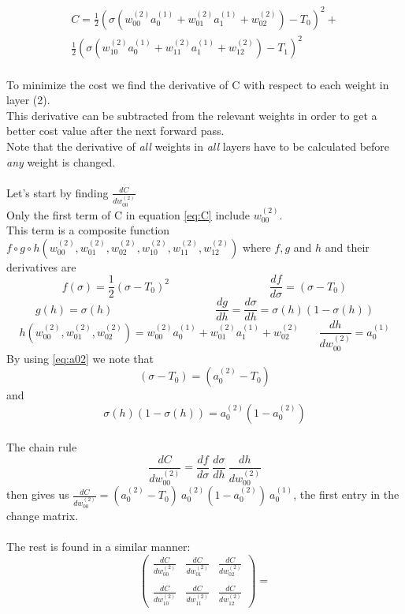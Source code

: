 \documentclass{article}
\begin{document}
\begin{equation} \label{eq:C} 
\begin{aligned}
C = \frac {1}{2}(\sigma(w_{00}^{(2)}a_0^{(1)}+w_{01}^{(2)}a_1^{(1)}+w_{02}^{(2)})-T_0)^2 + 
\\
\frac {1}{2}(\sigma(w_{10}^{(2)}a_0^{(1)}+w_{11}^{(2)}a_1^{(1)}+w_{12}^{(2)})-T_1)^2
\end{aligned}
\end{equation}
\\
To minimize the cost we find the derivative of C with respect to each weight in layer (2).
\\
This derivative can be subtracted from the relevant weights in order to get a better cost value after the next forward pass.
\\
Note that the derivative of \textit{all} weights in \textit{all} layers have to be calculated before \textit{any} weight is changed.
\\
\\
Let's start by finding $\frac{dC}{dw_{00}^{(2)}}$
\\
Only the first term of C in equation \eqref{eq:C} include $w_{00}^{(2)}$.
\\
This term is a composite function $f \circ g \circ h(w_{00}^{(2)}, w_{01}^{(2)}, w_{02}^{(2)}, w_{10}^{(2)}, w_{11}^{(2)},w_{12}^{(2)})$ where $f, g$ and $h$ and their derivatives are
$$f(\sigma) = \frac {1}{2}(\sigma-T_0)^2~~~~~~~~~~~~~~~~~~~~~~~~~~~~~~~~~~~~~~~~~\frac{df}{d\sigma} = (\sigma-T_0)$$
$$g(h) = \sigma(h)~~~~~~~~~~~~~~~~~~~~~~~~~~~~~~~~~~~~~~~~~~\frac{dg}{dh} = \frac{d\sigma}{dh} = \sigma(h)(1 - \sigma(h))$$ 
$$h(w_{00}^{(2)}, w_{01}^{(2)}, w_{02}^{(2)}) = w_{00}^{(2)}a_0^{(1)}+w_{01}^{(2)}a_1^{(1)}+w_{02}^{(2)}~~~~~~~~\frac{dh}{dw_{00}^{(2)}} = a_0^{(1)}$$
By using  \eqref{eq:a02} we note that $$(\sigma - T_0) = (a_0^{(2)} - T_0)$$ and $$\sigma(h)(1-\sigma(h)) =a_0^{(2)}(1-a_0^{(2)})$$ 
\\ The chain rule $$\frac{dC}{dw_{00}^{(2)}} = \frac{df}{d\sigma}~\frac{d\sigma}{dh}~\frac{dh}{dw_{00}^{(2)}}$$ 
then gives us
$\frac{dC}{dw_{00}^{(2)}} = (a_0^{(2)}-T_0)~a_0^{(2)}(1-a_0^{(2)})~a_0^{(1)} $, the first entry in the change matrix.
\\
\\
The rest is found in a similar manner:
$$\begin{pmatrix}
\frac{dC}{dw_{00}^{(2)}} & \frac{dC}{dw_{01}^{(2)}} & \frac{dC}{dw_{02}^{(2)}}
\\\\
\frac{dC}{dw_{10}^{(2)}} & \frac{dC}{dw_{11}^{(2)}} & \frac{dC}{dw_{12}^{(2)}} 
\end{pmatrix} =
$$
\end{document}
